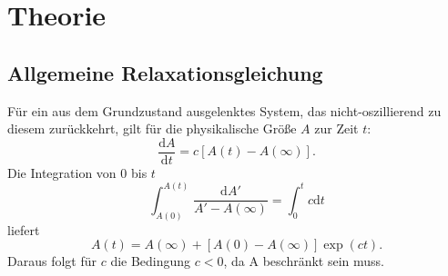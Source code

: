 
\section{Theorie}
\label{sec:Theorie}
\subsection{Allgemeine Relaxationsgleichung}
Für ein aus dem Grundzustand ausgelenktes System, das nicht-oszillierend zu diesem zurückkehrt, gilt für die physikalische Größe $A$ zur Zeit $t$:
\begin{equation}
\frac{\mathrm{d}A}{\mathrm{d}t}=c\left[A(t)-A(\infty)\right]\text{.}
\end{equation}
Die Integration von $0$ bis $t$
\[
\int_{A(0)}^{A(t)} \frac{\mathrm{d}A'}{A' - A(\infty)}=\int_0^tc\mathrm{d}t
\]
liefert 
\begin{equation}
A(t) = A(\infty) + \left[A(0)-A(\infty)\right]\exp(ct)\text{.}
\end{equation}
Daraus folgt für $c$ die Bedingung $c<0$, da A beschränkt sein muss.
